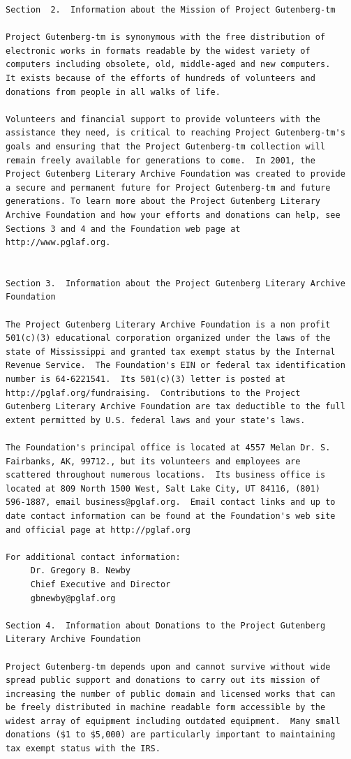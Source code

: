 \documentclass{book}[2004/02/16]
\begin{document}
\begin{verbatim}
Section  2.  Information about the Mission of Project Gutenberg-tm

Project Gutenberg-tm is synonymous with the free distribution of
electronic works in formats readable by the widest variety of
computers including obsolete, old, middle-aged and new computers.
It exists because of the efforts of hundreds of volunteers and
donations from people in all walks of life.

Volunteers and financial support to provide volunteers with the
assistance they need, is critical to reaching Project Gutenberg-tm's
goals and ensuring that the Project Gutenberg-tm collection will
remain freely available for generations to come.  In 2001, the
Project Gutenberg Literary Archive Foundation was created to provide
a secure and permanent future for Project Gutenberg-tm and future
generations. To learn more about the Project Gutenberg Literary
Archive Foundation and how your efforts and donations can help, see
Sections 3 and 4 and the Foundation web page at
http://www.pglaf.org.


Section 3.  Information about the Project Gutenberg Literary Archive
Foundation

The Project Gutenberg Literary Archive Foundation is a non profit
501(c)(3) educational corporation organized under the laws of the
state of Mississippi and granted tax exempt status by the Internal
Revenue Service.  The Foundation's EIN or federal tax identification
number is 64-6221541.  Its 501(c)(3) letter is posted at
http://pglaf.org/fundraising.  Contributions to the Project
Gutenberg Literary Archive Foundation are tax deductible to the full
extent permitted by U.S. federal laws and your state's laws.

The Foundation's principal office is located at 4557 Melan Dr. S.
Fairbanks, AK, 99712., but its volunteers and employees are
scattered throughout numerous locations.  Its business office is
located at 809 North 1500 West, Salt Lake City, UT 84116, (801)
596-1887, email business@pglaf.org.  Email contact links and up to
date contact information can be found at the Foundation's web site
and official page at http://pglaf.org

For additional contact information:
     Dr. Gregory B. Newby
     Chief Executive and Director
     gbnewby@pglaf.org

Section 4.  Information about Donations to the Project Gutenberg
Literary Archive Foundation

Project Gutenberg-tm depends upon and cannot survive without wide
spread public support and donations to carry out its mission of
increasing the number of public domain and licensed works that can
be freely distributed in machine readable form accessible by the
widest array of equipment including outdated equipment.  Many small
donations ($1 to $5,000) are particularly important to maintaining
tax exempt status with the IRS.


\end{verbatim}
\end{document}

